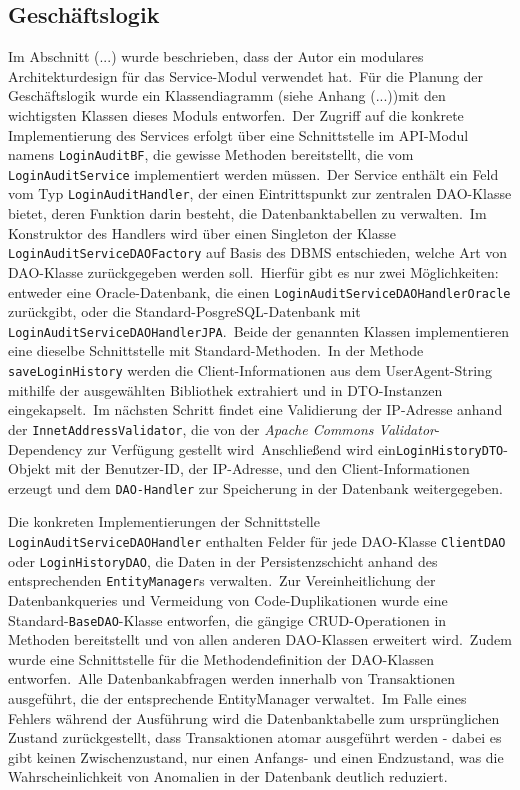 \subsection{Geschäftslogik}
\label{subsec:Geschaeftslogik}
Im Abschnitt (...) wurde beschrieben, dass der Autor ein modulares Architekturdesign für das Service-Modul verwendet hat.\ Für die Planung der Geschäftslogik wurde ein Klassendiagramm (siehe Anhang (...))mit den wichtigsten Klassen dieses Moduls entworfen.\ Der Zugriff
auf die konkrete Implementierung des Services erfolgt über eine Schnittstelle im API-Modul namens \texttt{LoginAuditBF}, die gewisse Methoden bereitstellt, die vom \texttt{LoginAuditService} implementiert werden müssen.\ Der Service enthält ein Feld vom Typ
\texttt{LoginAuditHandler}, der einen Eintrittspunkt zur zentralen DAO-Klasse bietet, deren Funktion darin besteht, die Datenbanktabellen zu verwalten.\ Im Konstruktor des Handlers wird über einen Singleton der Klasse \texttt{LoginAuditServiceDAOFactory} auf Basis des DBMS entschieden,
welche Art von DAO-Klasse zurückgegeben werden soll.\ Hierfür gibt es nur zwei Möglichkeiten: entweder eine Oracle-Datenbank, die einen \texttt{LoginAuditServiceDAOHandlerOracle} zurückgibt, oder die Standard-PosgreSQL-Datenbank mit \texttt{LoginAuditServiceDAOHandlerJPA}.\ Beide der
genannten Klassen implementieren eine dieselbe Schnittstelle mit Standard-Methoden.\ In der Methode \texttt{saveLoginHistory} werden die Client-Informationen aus dem UserAgent-String mithilfe der ausgewählten Bibliothek extrahiert und in DTO-Instanzen eingekapselt.\ Im nächsten Schritt
findet eine Validierung der IP-Adresse anhand der \texttt{InnetAddressValidator}, die von der \textit{Apache Commons Validator}-Dependency zur Verfügung gestellt wird\ Anschließend wird ein\texttt{LoginHistoryDTO}-Objekt mit der Benutzer-ID, der IP-Adresse, und den Client-Informationen erzeugt
und dem \texttt{DAO-Handler} zur Speicherung in der Datenbank weitergegeben.

Die konkreten Implementierungen der Schnittstelle \texttt{LoginAuditServiceDAOHandler} enthalten Felder für jede DAO-Klasse \zB \texttt{ClientDAO} oder \texttt{LoginHistoryDAO},
die Daten in der Persistenzschicht anhand des entsprechenden \texttt{EntityManager}s verwalten.\ Zur Vereinheitlichung der Datenbankqueries und Vermeidung von Code-Duplikationen wurde
eine Standard-\bzw \texttt{BaseDAO}-Klasse entworfen, die gängige CRUD-Operationen in Methoden bereitstellt und von allen anderen DAO-Klassen erweitert wird.\ Zudem wurde eine Schnittstelle für die
Methodendefinition der DAO-Klassen entworfen.\ Alle Datenbankabfragen werden innerhalb von Transaktionen ausgeführt, die der entsprechende EntityManager verwaltet.\ Im Falle eines Fehlers während der Ausführung wird die Datenbanktabelle zum ursprünglichen Zustand zurückgestellt,
\dh dass Transaktionen atomar ausgeführt werden - dabei es gibt keinen Zwischenzustand, nur einen Anfangs- und einen Endzustand, was die Wahrscheinlichkeit von Anomalien in der Datenbank deutlich reduziert.

